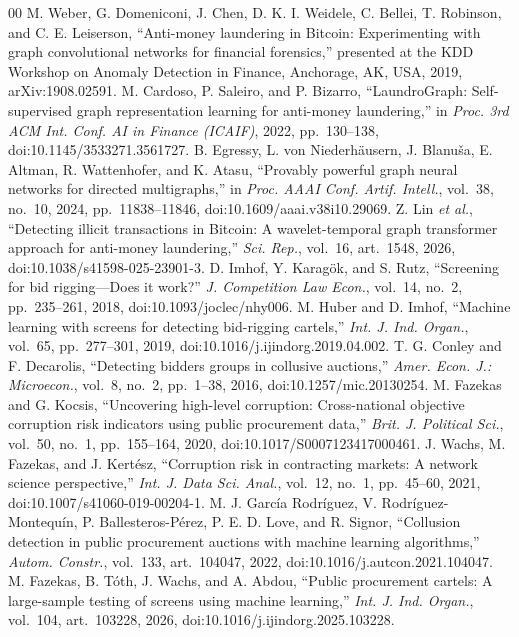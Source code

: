 \documentclass[conference]{IEEEtran}
\begin{document}
\begin{thebibliography}{00}
 M. Weber, G. Domeniconi, J. Chen, D. K. I. Weidele, C. Bellei, T. Robinson, and C. E. Leiserson, ``Anti-money laundering in Bitcoin: Experimenting with graph convolutional networks for financial forensics,'' presented at the KDD Workshop on Anomaly Detection in Finance, Anchorage, AK, USA, 2019, arXiv:1908.02591.
 M. Cardoso, P. Saleiro, and P. Bizarro, ``LaundroGraph: Self-supervised graph representation learning for anti-money laundering,'' in \emph{Proc. 3rd ACM Int. Conf. AI in Finance (ICAIF)}, 2022, pp.~130--138, doi:10.1145/3533271.3561727.
 B. Egressy, L. von Niederh\"ausern, J. Blanu\v{s}a, E. Altman, R. Wattenhofer, and K. Atasu, ``Provably powerful graph neural networks for directed multigraphs,'' in \emph{Proc. AAAI Conf. Artif. Intell.}, vol.~38, no.~10, 2024, pp.~11838--11846, doi:10.1609/aaai.v38i10.29069.
 Z. Lin \emph{et al.}, ``Detecting illicit transactions in Bitcoin: A wavelet-temporal graph transformer approach for anti-money laundering,'' \emph{Sci. Rep.}, vol.~16, art.~1548, 2026, doi:10.1038/s41598-025-23901-3.
 D. Imhof, Y. Karag\"ok, and S. Rutz, ``Screening for bid rigging---Does it work?'' \emph{J. Competition Law Econ.}, vol.~14, no.~2, pp.~235--261, 2018, doi:10.1093/joclec/nhy006.
 M. Huber and D. Imhof, ``Machine learning with screens for detecting bid-rigging cartels,'' \emph{Int. J. Ind. Organ.}, vol.~65, pp.~277--301, 2019, doi:10.1016/j.ijindorg.2019.04.002.
 T. G. Conley and F. Decarolis, ``Detecting bidders groups in collusive auctions,'' \emph{Amer. Econ. J.: Microecon.}, vol.~8, no.~2, pp.~1--38, 2016, doi:10.1257/mic.20130254.
 M. Fazekas and G. Kocsis, ``Uncovering high-level corruption: Cross-national objective corruption risk indicators using public procurement data,'' \emph{Brit. J. Political Sci.}, vol.~50, no.~1, pp.~155--164, 2020, doi:10.1017/S0007123417000461.
 J. Wachs, M. Fazekas, and J. Kert\'esz, ``Corruption risk in contracting markets: A network science perspective,'' \emph{Int. J. Data Sci. Anal.}, vol.~12, no.~1, pp.~45--60, 2021, doi:10.1007/s41060-019-00204-1.
 M. J. Garc\'ia Rodr\'iguez, V. Rodr\'iguez-Montequ\'in, P. Ballesteros-P\'erez, P. E. D. Love, and R. Signor, ``Collusion detection in public procurement auctions with machine learning algorithms,'' \emph{Autom. Constr.}, vol.~133, art.~104047, 2022, doi:10.1016/j.autcon.2021.104047.
 M. Fazekas, B. T\'oth, J. Wachs, and A. Abdou, ``Public procurement cartels: A large-sample testing of screens using machine learning,'' \emph{Int. J. Ind. Organ.}, vol.~104, art.~103228, 2026, doi:10.1016/j.ijindorg.2025.103228.

\end{thebibliography}
\end{document}
